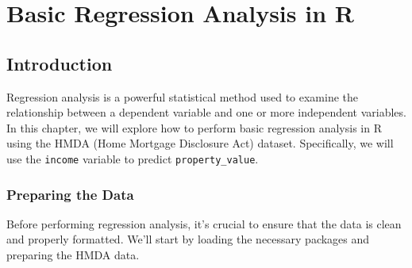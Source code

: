 \documentclass[
]{book}
\begin{document}
\hypertarget{basic-regression-analysis-in-r}{%
\chapter{Basic Regression Analysis in R}\label{basic-regression-analysis-in-r}}

\hypertarget{introduction-2}{%
\section{Introduction}\label{introduction-2}}

Regression analysis is a powerful statistical method used to examine the relationship between a dependent variable and one or more independent variables. In this chapter, we will explore how to perform basic regression analysis in R using the HMDA (Home Mortgage Disclosure Act) dataset. Specifically, we will use the \texttt{income} variable to predict \texttt{property\_value}.

\hypertarget{preparing-the-data}{%
\subsection{Preparing the Data}\label{preparing-the-data}}

Before performing regression analysis, it's crucial to ensure that the data is clean and properly formatted. We'll start by loading the necessary packages and preparing the HMDA data.
\end{document}
